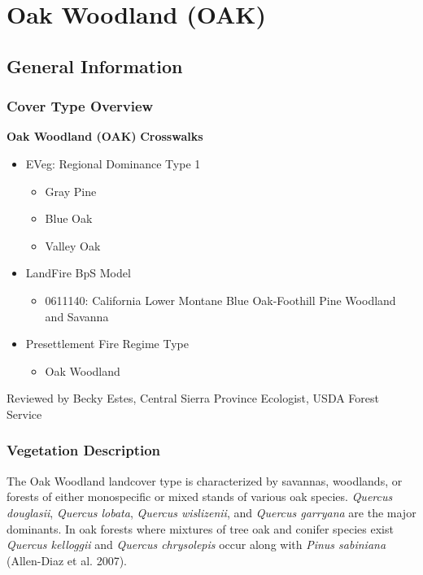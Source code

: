 \newpage
\section{Oak Woodland (OAK)}
\label{oak-description}

\subsection*{General Information}

\subsubsection{Cover Type Overview}

\textbf{Oak Woodland (OAK)} 
\newline
\textbf{Crosswalks}
\begin{itemize}
	\item EVeg: Regional Dominance Type 1
	\begin{itemize}
		\item Gray Pine
		\item Blue Oak
		\item Valley Oak
	\end{itemize}

	\item LandFire BpS Model
	\begin{itemize}
		\item 0611140: California Lower Montane Blue Oak-Foothill Pine Woodland and Savanna
	\end{itemize}

	\item Presettlement Fire Regime Type
	\begin{itemize}
		\item Oak Woodland
	\end{itemize}
\end{itemize}

\noindent Reviewed by Becky Estes, Central Sierra Province Ecologist, USDA Forest Service

\subsubsection{Vegetation Description}
The Oak Woodland landcover type is characterized by savannas, woodlands, or forests of either monospecific or mixed stands of various oak species. \emph{Quercus douglasii}, \emph{Quercus lobata}, \emph{Quercus wislizenii}, and \emph{Quercus garryana} are the major dominants. In oak forests where mixtures of tree oak and conifer species exist \emph{Quercus kelloggii} and \emph{Quercus chrysolepis} occur along with \emph{Pinus sabiniana} (Allen-Diaz et al. 2007). 


